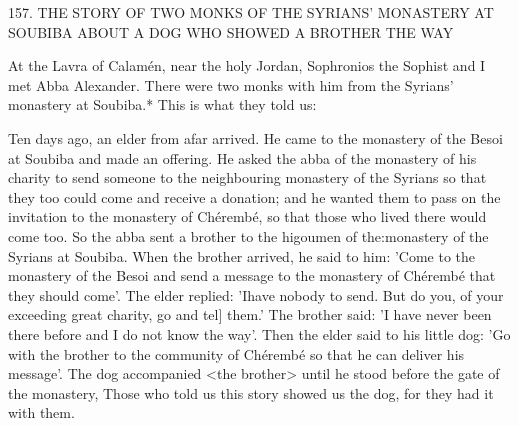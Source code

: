 157. THE STORY OF TWO MONKS
OF THE SYRIANS' MONASTERY AT
SOUBIBA ABOUT A DOG WHO SHOWED A BROTHER
THE WAY

At the Lavra of Calamén, near the holy Jordan, Sophronios the
Sophist and I met Abba Alexander. There were two monks with
him from the Syrians' monastery at Soubiba.* This is what they told
us:

Ten days ago, an elder from afar arrived. He came to the monastery
of the Besoi at Soubiba and made an offering. He asked the abba
of the monastery of his charity to send someone to the neighbouring
monastery of the Syrians so that they too could come and receive
a donation; and he wanted them to pass on the invitation to the
monastery of Chérembé, so that those who lived there would come
too. So the abba sent a brother to the higoumen of the:monastery
of the Syrians at Soubiba. When the brother arrived, he said to him:
'Come to the monastery of the Besoi and send a message to the
monastery of Chérembé that they should come'. The elder replied:
'Ihave nobody to send. But do you, of your exceeding great charity,
go and tel] them.' The brother said: 'I have never been there before
and I do not know the way'. Then the elder said to his little dog:
'Go with the brother to the community of Chérembé so that he can
deliver his message'. The dog accompanied <the brother> until he
stood before the gate of the monastery, Those who told us this story
showed us the dog, for they had it with them.


